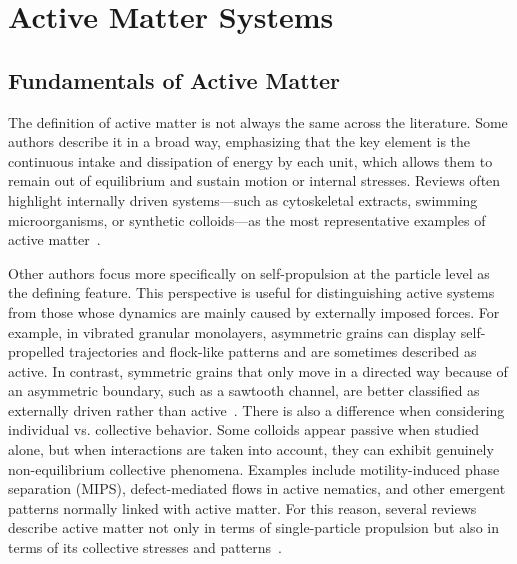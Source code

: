 \chapter{Active Matter Systems}
\label{ch:activeandpassivemattersystems}

\section{Fundamentals of Active Matter}
\label{sct:fundamentalsofactivematter}


The definition of active matter is not always the same across the literature. Some authors describe it in a broad way, emphasizing that the key element is the continuous intake and dissipation of energy by each unit, which allows them to remain out of equilibrium and sustain motion or internal stresses. Reviews often highlight internally driven systems—such as cytoskeletal extracts, swimming microorganisms, or synthetic colloids—as the most representative examples of active matter~\cite{ramaswamy2010mechanics, marchetti2013hydrodynamics, bechinger2016active}.

Other authors focus more specifically on self-propulsion at the particle level as the defining feature. This perspective is useful for distinguishing active systems from those whose dynamics are mainly caused by externally imposed forces. For example, in vibrated granular monolayers, asymmetric grains can display self-propelled trajectories and flock-like patterns and are sometimes described as active. In contrast, symmetric grains that only move in a directed way because of an asymmetric boundary, such as a sawtooth channel, are better classified as externally driven rather than active~\cite{deseigne2010collective, mobarakabadi2013granular, fernandez2022active}.
There is also a difference when considering individual vs. collective behavior. Some colloids appear passive when studied alone, but when interactions are taken into account, they can exhibit genuinely non-equilibrium collective phenomena. Examples include motility-induced phase separation (MIPS), defect-mediated flows in active nematics, and other emergent patterns normally linked with active matter. For this reason, several reviews describe active matter not only in terms of single-particle propulsion but also in terms of its collective stresses and patterns~\cite{cates2015motility, doostmohammadi2018active}.


